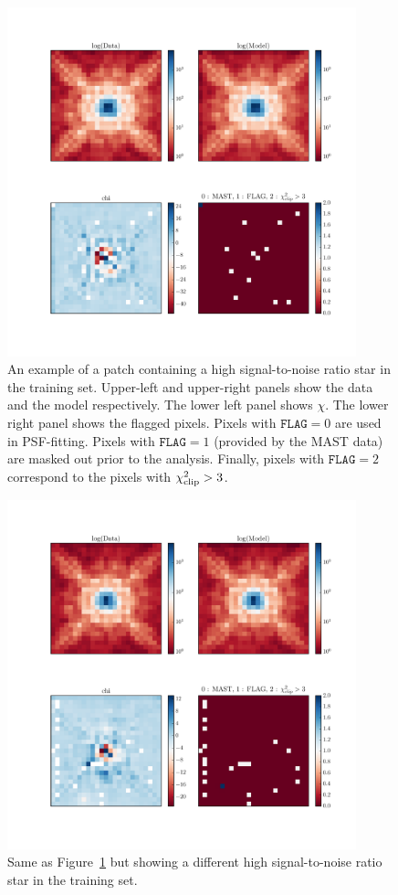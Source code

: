 \begin{figure}
\includegraphics[width=0.9\textwidth , height=0.9\textwidth ]{figures/wfc3ir/training.pdf}
\caption{\label{fig:training_1} An example of a patch containing a high signal-to-noise ratio star in the training set. Upper-left and upper-right panels show the data and the model respectively. The lower left panel shows $\chi$. The lower right panel shows the flagged pixels. Pixels with $\mathtt{FLAG}=0$ are used in PSF-fitting. Pixels with $\mathtt{FLAG}=1$ (provided by the MAST data) are masked out prior to the analysis. Finally, pixels with $\mathtt{FLAG}=2$ correspond to the pixels with $\chi^{2}_{\rm clip} > 3$.}
\end{figure}

\begin{figure}
\includegraphics[width=0.9\textwidth , height=0.9\textwidth ]{figures/wfc3ir/training2.pdf}
\caption{\label{fig:training_2} Same as Figure~\ref{fig:training_1} but showing a different high signal-to-noise ratio star in the training set.}
\end{figure}

